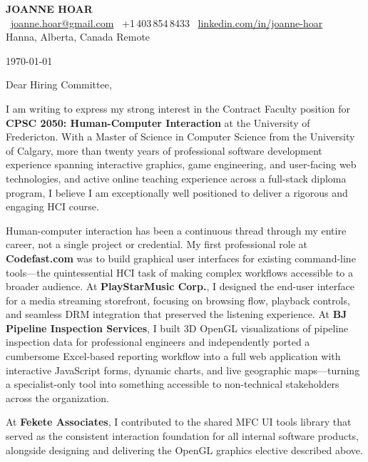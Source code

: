 \documentclass[11pt]{article}
\begin{document}
\pagestyle{empty}

\begin{flushleft}
{\Large \textbf{\textcolor{accent}{JOANNE HOAR}}} \\[2pt]
~\href{mailto:joanne.hoar@gmail.com}{joanne.hoar@gmail.com} \quad
{}~+1\,403\,854\,8433 \quad
{}~\href{https://linkedin.com/in/joanne-hoar/}{linkedin.com/in/joanne-hoar} \\
Hanna, Alberta, Canada \textbullet{} Remote
\end{flushleft}

\vspace{8pt}
\today

\vspace{12pt}
Dear Hiring Committee,

\vspace{6pt}
I am writing to express my strong interest in the Contract Faculty position for \textbf{CPSC 2050: Human-Computer Interaction} at the University of Fredericton. With a Master of Science in Computer Science from the University of Calgary, more than twenty years of professional software development experience spanning interactive graphics, game engineering, and user-facing web technologies, and active online teaching experience across a full-stack diploma program, I believe I am exceptionally well positioned to deliver a rigorous and engaging HCI course.

Human-computer interaction has been a continuous thread through my entire career, not a single project or credential. My first professional role at \textbf{Codefast.com} was to build graphical user interfaces for existing command-line tools---the quintessential HCI task of making complex workflows accessible to a broader audience. At \textbf{PlayStarMusic Corp.}, I designed the end-user interface for a media streaming storefront, focusing on browsing flow, playback controls, and seamless DRM integration that preserved the listening experience. At \textbf{BJ Pipeline Inspection Services}, I built 3D OpenGL visualizations of pipeline inspection data for professional engineers and independently ported a cumbersome Excel-based reporting workflow into a full web application with interactive JavaScript forms, dynamic charts, and live geographic maps---turning a specialist-only tool into something accessible to non-technical stakeholders across the organization.

At \textbf{Fekete Associates}, I contributed to the shared MFC UI tools library that served as the consistent interaction foundation for all internal software products, alongside designing and delivering the OpenGL graphics elective described above.
\end{document}
